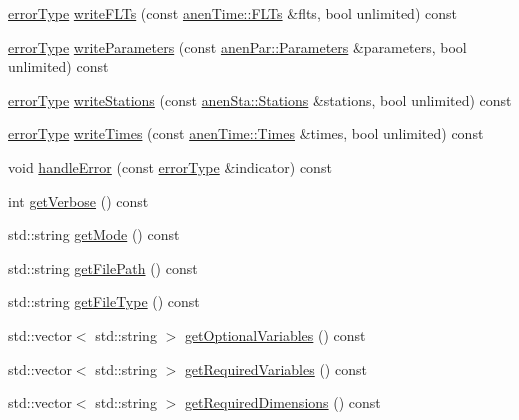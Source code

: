 \begin{DoxyCompactItemize}
\item 
\mbox{\hyperlink{class_an_en_i_o_aa56bc1ec6610b86db4349bce20f9ead0}{error\+Type}} \mbox{\hyperlink{class_an_en_i_o_a150e3fc6fe249b11bac909e5ee843a58}{write\+F\+L\+Ts}} (const \mbox{\hyperlink{classanen_time_1_1_f_l_ts}{anen\+Time\+::\+F\+L\+Ts}} \&flts, bool unlimited) const
\item 
\mbox{\hyperlink{class_an_en_i_o_aa56bc1ec6610b86db4349bce20f9ead0}{error\+Type}} \mbox{\hyperlink{class_an_en_i_o_a9ae88d089b2de16571085cb6f7f4cefb}{write\+Parameters}} (const \mbox{\hyperlink{classanen_par_1_1_parameters}{anen\+Par\+::\+Parameters}} \&parameters, bool unlimited) const
\item 
\mbox{\hyperlink{class_an_en_i_o_aa56bc1ec6610b86db4349bce20f9ead0}{error\+Type}} \mbox{\hyperlink{class_an_en_i_o_ac4cb6e66c0661eff0a10dcc3cb3324e8}{write\+Stations}} (const \mbox{\hyperlink{classanen_sta_1_1_stations}{anen\+Sta\+::\+Stations}} \&stations, bool unlimited) const
\item 
\mbox{\hyperlink{class_an_en_i_o_aa56bc1ec6610b86db4349bce20f9ead0}{error\+Type}} \mbox{\hyperlink{class_an_en_i_o_a13ba268b1cae107c145ad8ed895ddedd}{write\+Times}} (const \mbox{\hyperlink{classanen_time_1_1_times}{anen\+Time\+::\+Times}} \&times, bool unlimited) const
\item 
void \mbox{\hyperlink{class_an_en_i_o_a92276aeba9c0b5bd1cd3d285271d505f}{handle\+Error}} (const \mbox{\hyperlink{class_an_en_i_o_aa56bc1ec6610b86db4349bce20f9ead0}{error\+Type}} \&indicator) const
\item 
int \mbox{\hyperlink{class_an_en_i_o_a0bf0dab5e393c5597f97ab38c910e24d}{get\+Verbose}} () const
\item 
std\+::string \mbox{\hyperlink{class_an_en_i_o_a85d6f6dbf12ba5250ebc93065b7cb50c}{get\+Mode}} () const
\item 
std\+::string \mbox{\hyperlink{class_an_en_i_o_aae00624f6127c7946496443f5322ec8e}{get\+File\+Path}} () const
\item 
std\+::string \mbox{\hyperlink{class_an_en_i_o_a6f51b190d64895a4ad907abcf4a10b75}{get\+File\+Type}} () const
\item 
std\+::vector$<$ std\+::string $>$ \mbox{\hyperlink{class_an_en_i_o_a50997e1baef5b8bb18d833c8c875a7bc}{get\+Optional\+Variables}} () const
\item 
std\+::vector$<$ std\+::string $>$ \mbox{\hyperlink{class_an_en_i_o_abd3cbf0e384dd9d610f985fb4131df9b}{get\+Required\+Variables}} () const
\item 
std\+::vector$<$ std\+::string $>$ \mbox{\hyperlink{class_an_en_i_o_a80e8d2bc7f90b24b93c560a24aeb126e}{get\+Required\+Dimensions}} () const

\end{DoxyCompactItemize}
